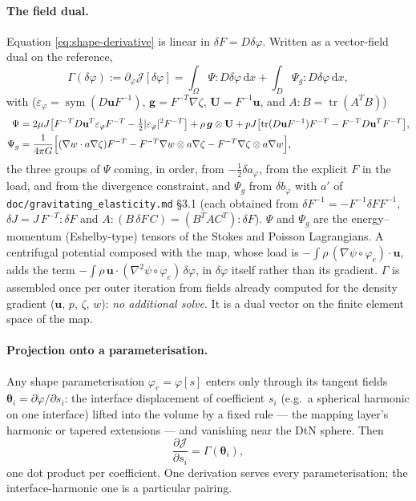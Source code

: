 \documentclass[11pt]{article}
\newcommand{\Jf}{\mathscr{J}}  %
\newcommand{\eps}{\varepsilon}
\newcommand{\bu}{\mathbf{u}}
\newcommand{\bU}{\mathbf{U}}
\newcommand{\dx}{\,\mathrm{d}x}
\newcommand{\tr}{\operatorname{tr}}
\newcommand{\sym}{\operatorname{sym}}
\begin{document}
\paragraph{The field dual.} Equation \eqref{eq:shape-derivative} is
linear in $\delta F = D\delta\varphi$. Written as a vector-field dual on
the reference,
\begin{equation}
  \Gamma(\delta\varphi) := \partial_\varphi \Jf [\delta\varphi]
  = \int_{\Omega}\Psi : D\delta\varphi\dx
  + \int_{D}\Psi_{g} : D\delta\varphi\dx ,
  \label{eq:field-dual}
\end{equation}
with ($\eps_\varphi = \sym(D\bu F^{-1})$, $\bm{g} = F^{-T}\nabla\zeta$,
$\bU = F^{-1}\bu$, and $A:B = \tr(A^TB)$)
\begin{align}
  \Psi &= 2\mu J\bigl[F^{-T}D\bu^{T}\eps_\varphi F^{-T}
          - \tfrac12|\eps_\varphi|^{2}F^{-T}\bigr]
          + \rho\,\bm{g}\otimes\bU
          + pJ\bigl[\tr(D\bu F^{-1})F^{-T} - F^{-T}D\bu^{T}F^{-T}\bigr],
  \\
  \Psi_{g} &= \frac{1}{4\pi G}\Bigl[(\nabla w\cdot a\nabla\zeta)F^{-T}
          - F^{-T}\nabla w\otimes a\nabla\zeta
          - F^{-T}\nabla\zeta\otimes a\nabla w\Bigr] ,
\end{align}
the three groups of $\Psi$ coming, in order, from $-\tfrac12\delta
a_\varphi$, from the explicit $F$ in the load, and from the divergence
constraint, and $\Psi_g$ from $\delta b_\varphi$ with $a'$ of
\texttt{doc/gravitating\_elasticity.md} \S3.1 (each obtained from
$\delta F^{-1} = -F^{-1}\delta FF^{-1}$, $\delta J = J\,F^{-T}:\delta F$
and $A:(B\,\delta F\,C) = (B^TAC^T):\delta F$). $\Psi$ and $\Psi_g$ are the
energy--momentum (Eshelby-type) tensors of the Stokes and Poisson
Lagrangians. A centrifugal potential composed with the map, whose load
is $-\int\rho\,(\nabla\psi\circ\varphi_e)\cdot\bu$, adds the term
$-\int\rho\,\bu\cdot(\nabla^2\psi\circ\varphi_e)\,\delta\varphi$, in
$\delta\varphi$ itself rather than its gradient. $\Gamma$ is assembled once per outer
iteration from fields already computed for the density gradient ($\bu$,
$p$, $\zeta$, $w$): \emph{no additional solve}. It is a dual vector on
the finite element space of the map.

\paragraph{Projection onto a parameterisation.} Any shape
parameterisation $\varphi_e = \varphi[s]$ enters only through its
tangent fields $\bm{\theta}_i = \partial\varphi/\partial s_i$: the
interface displacement of coefficient $s_i$ (e.g.\ a spherical harmonic
on one interface) lifted into the volume by a fixed rule --- the mapping
layer's harmonic or tapered extensions --- and vanishing near the DtN
sphere. Then
\begin{equation}
  \frac{\partial \Jf }{\partial s_i} = \Gamma(\bm{\theta}_i) ,
\end{equation}
one dot product per coefficient. One derivation serves every
parameterisation; the interface-harmonic one is a particular pairing.
\end{document}

